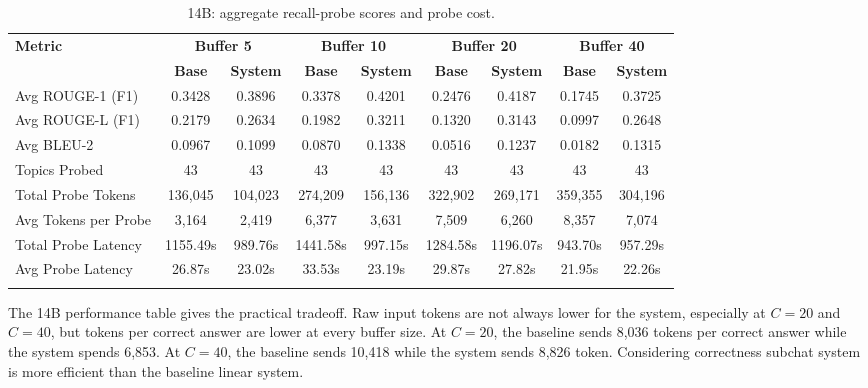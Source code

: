 \begin{table}[htbp]
\caption{14B: aggregate recall-probe scores and probe cost.}\label{tab:14b_recall_main}
\centering
\scriptsize
\setlength{\tabcolsep}{3pt}
\begin{adjustbox}{width=\textwidth}
\begin{tabular}{lcccccccc}
\toprule
\textbf{Metric} & \multicolumn{2}{c}{\textbf{Buffer 5}} & \multicolumn{2}{c}{\textbf{Buffer 10}} & \multicolumn{2}{c}{\textbf{Buffer 20}} & \multicolumn{2}{c}{\textbf{Buffer 40}} \\
\cmidrule(lr){2-3}\cmidrule(lr){4-5}\cmidrule(lr){6-7}\cmidrule(lr){8-9}
 & \textbf{Base} & \textbf{System} & \textbf{Base} & \textbf{System} & \textbf{Base} & \textbf{System} & \textbf{Base} & \textbf{System} \\
\midrule
Avg ROUGE-1 (F1) & 0.3428 & 0.3896 & 0.3378 & 0.4201 & 0.2476 & 0.4187 & 0.1745 & 0.3725 \\
Avg ROUGE-L (F1) & 0.2179 & 0.2634 & 0.1982 & 0.3211 & 0.1320 & 0.3143 & 0.0997 & 0.2648 \\
Avg BLEU-2 & 0.0967 & 0.1099 & 0.0870 & 0.1338 & 0.0516 & 0.1237 & 0.0182 & 0.1315 \\
Topics Probed & 43 & 43 & 43 & 43 & 43 & 43 & 43 & 43 \\
Total Probe Tokens & 136,045 & 104,023 & 274,209 & 156,136 & 322,902 & 269,171 & 359,355 & 304,196 \\
Avg Tokens per Probe & 3,164 & 2,419 & 6,377 & 3,631 & 7,509 & 6,260 & 8,357 & 7,074 \\
Total Probe Latency & 1155.49s & 989.76s & 1441.58s & 997.15s & 1284.58s & 1196.07s & 943.70s & 957.29s \\
Avg Probe Latency & 26.87s & 23.02s & 33.53s & 23.19s & 29.87s & 27.82s & 21.95s & 22.26s \\
\botrule
\end{tabular}
\end{adjustbox}
\end{table}

The 14B performance table gives the practical tradeoff. Raw input tokens are not always lower for the system, especially at $C=20$ and $C=40$, but tokens per correct answer are lower at every buffer size. At $C=20$, the baseline sends 8,036 tokens per correct answer while the system spends 6,853. At $C=40$, the baseline sends 10,418 while the system sends 8,826 token. Considering correctness subchat system is more efficient than the baseline linear system.














